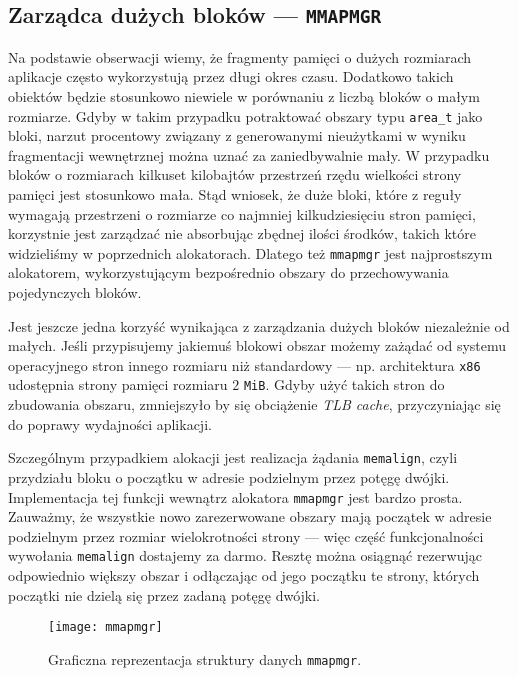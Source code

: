 \documentclass[12pt,a4paper,titlepage,twoside]{mwart}
\begin{document}
\subsection{Zarządca dużych bloków --- \texttt{MMAPMGR}}

Na podstawie obserwacji wiemy, że fragmenty pamięci o dużych rozmiarach
aplikacje często wykorzystują przez długi okres czasu. Dodatkowo takich
obiektów będzie stosunkowo niewiele w porównaniu z liczbą bloków o małym
rozmiarze. Gdyby w takim przypadku potraktować obszary typu \verb+area_t+ jako
bloki, narzut procentowy związany z generowanymi nieużytkami w wyniku
fragmentacji wewnętrznej można uznać za zaniedbywalnie mały. W przypadku bloków
o rozmiarach kilkuset kilobajtów przestrzeń rzędu wielkości strony pamięci
jest stosunkowo mała. Stąd wniosek, że duże bloki, które z reguły wymagają
przestrzeni o rozmiarze co najmniej kilkudziesięciu stron pamięci, korzystnie
jest zarządzać nie absorbując zbędnej ilości środków, takich które widzieliśmy
w poprzednich alokatorach. Dlatego też \verb+mmapmgr+ jest najprostszym
alokatorem, wykorzystującym bezpośrednio obszary do przechowywania pojedynczych
bloków.

Jest jeszcze jedna korzyść wynikająca z zarządzania dużych bloków niezależnie
od małych. Jeśli przypisujemy jakiemuś blokowi obszar możemy zażądać od
systemu operacyjnego stron innego rozmiaru niż standardowy --- np. architektura
\verb+x86+ udostępnia strony pamięci rozmiaru $2$ \verb+MiB+. Gdyby użyć takich
stron do zbudowania obszaru, zmniejszyło by się obciążenie \textit{TLB cache},
przyczyniając się do poprawy wydajności aplikacji.

Szczególnym przypadkiem alokacji jest realizacja żądania \verb+memalign+, czyli
przydziału bloku o początku w adresie podzielnym przez potęgę dwójki.
Implementacja tej funkcji wewnątrz alokatora \texttt{mmapmgr} jest bardzo
prosta. Zauważmy, że wszystkie nowo zarezerwowane obszary mają początek w
adresie podzielnym przez rozmiar wielokrotności strony --- więc część
funkcjonalności wywołania \verb+memalign+ dostajemy za darmo. Resztę można
osiągnąć rezerwując odpowiednio większy obszar i odłączając od jego początku te
strony, których początki nie dzielą się przez zadaną potęgę dwójki.

\begin{figure}[ht]
\centering
\texttt{[image: mmapmgr]}
\caption{Graficzna reprezentacja struktury danych \texttt{mmapmgr}.}
\end{figure}
\end{document}
